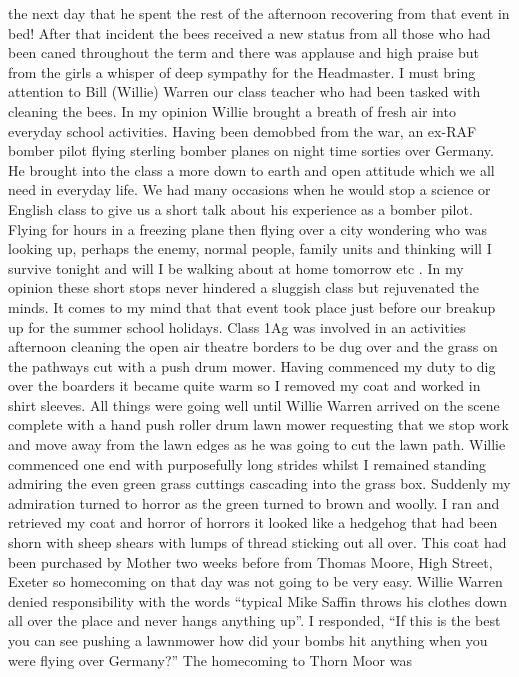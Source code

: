 the next day that he spent the rest of the afternoon recovering from that event
in bed! After that incident the bees received a new status from all those who
had been caned throughout the term and there was applause and high praise but
from the girls a whisper of deep sympathy for the Headmaster. I must bring
attention to Bill (Willie) Warren our class teacher who had been tasked with
cleaning the bees. In my opinion Willie brought a breath of fresh air into
everyday school activities. Having been demobbed from the war, an ex-RAF
bomber pilot flying sterling bomber planes on night time sorties over Germany.
He brought into the class a more down to earth and open attitude which we all
need in everyday life. We had many occasions when he would stop a science or
English class to give us a short talk about his experience as a bomber pilot.
Flying for hours in a freezing plane then flying over a city wondering who was
looking up, perhaps the enemy, normal people, family units and thinking will I
survive tonight and will I be walking about at home tomorrow etc . In my
opinion these short stops never hindered a sluggish class but rejuvenated the
minds. It comes to my mind that that event took place just before our breakup
up for the summer school holidays. Class 1Ag was involved in an activities
afternoon cleaning the open air theatre borders to be dug over and the grass on
the pathways cut with a push drum mower. Having commenced my duty to dig over
the boarders it became quite warm so I removed my coat and worked in shirt
sleeves. All things were going well until Willie Warren arrived on the scene
complete with a hand push roller drum lawn mower requesting that we stop work
and move away from the lawn edges as he was going to cut the lawn path. Willie
commenced one end with purposefully long strides whilst I remained standing
admiring the even green grass cuttings cascading into the grass box. Suddenly
my admiration turned to horror as the green turned to brown and woolly. I ran
and retrieved my coat and horror of horrors it looked like a hedgehog that had
been shorn with sheep shears with lumps of thread sticking out all over. This
coat had been purchased by Mother two weeks before from Thomas Moore, High
Street, Exeter so homecoming on that day was not going to be very easy. Willie
Warren denied responsibility with the words ``typical Mike Saffin throws his
clothes down all over the place and never hangs anything up''. I responded,
``If this is the best you can see pushing a lawnmower how did your bombs hit
anything when you were flying over Germany?'' The homecoming to Thorn Moor was
